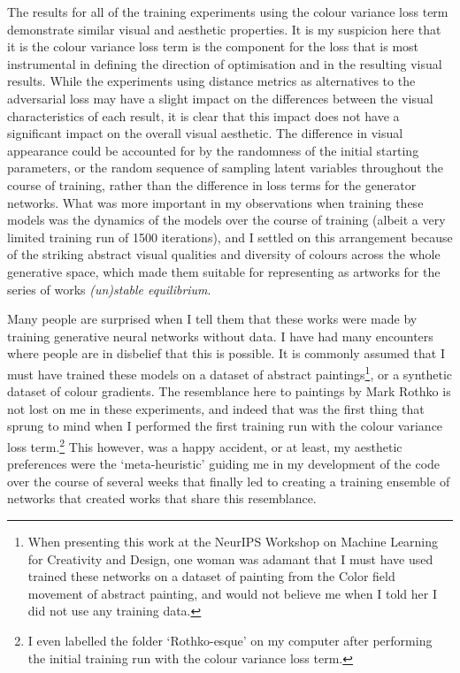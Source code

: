 The results for all of the training experiments using the colour variance loss term demonstrate similar visual and aesthetic properties. 
It is my suspicion here that it is the colour variance loss term is the component for the loss that is most instrumental in defining the direction of optimisation and in the resulting visual results.
While the experiments using distance metrics as alternatives to the adversarial loss may have a slight impact on the differences between the visual characteristics of each result, it is clear that this impact does not have a significant impact on the overall visual aesthetic.
The difference in visual appearance could be accounted for by the randomness of the initial starting parameters, or the random sequence of sampling latent variables throughout the course of training, rather than the difference in loss terms for the generator networks.
What was more important in my observations when training these models was the dynamics of the models over the course of training (albeit a very limited training run of 1500 iterations), and I settled on this arrangement because of the striking abstract visual qualities and diversity of colours across the whole generative space, which made them suitable for representing as artworks for the series of works \textit{(un)stable equilibrium}. 

Many people are surprised when I tell them that these works were made by training generative neural networks without data.
I have had many encounters where people are in disbelief that this is possible. It is commonly assumed that I must have trained these models on a dataset of abstract paintings\footnote{When presenting this work at the NeurIPS Workshop on Machine Learning for Creativity and Design, one woman was adamant that I must have used trained these networks on a dataset of painting from the Color field movement of abstract painting, and would not believe me when I told her I did not use any training data.}, or a synthetic dataset of colour gradients. 
The resemblance here to paintings by Mark Rothko is not lost on me in these experiments, and indeed that was the first thing that sprung to mind when I performed the first training run with the colour variance loss term.\footnote{I even labelled the folder `Rothko-esque' on my computer after performing the initial training run with the colour variance loss term.} 
This however, was a happy accident, or at least, my aesthetic preferences were the `meta-heuristic' guiding me in my development of the code over the course of several weeks that finally led to creating a training ensemble of networks that created works that share this resemblance.

